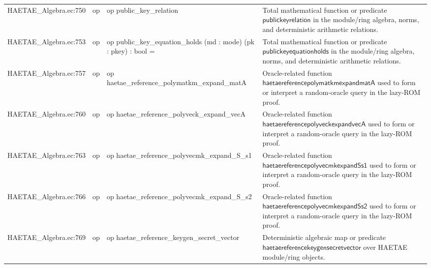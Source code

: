 \documentclass[10pt]{article}
\begin{document}
\begin{longtable}{L{0.11\textwidth}L{0.055\textwidth}L{0.385\textwidth}L{0.41\textwidth}}
HAETAE\_\allowbreak{}Algebra.\allowbreak{}ec:\allowbreak{}750 & op & {\ttfamily\scriptsize op public\_\allowbreak{}key\_\allowbreak{}relation} & Total mathematical function or predicate $\mathsf{publickeyrelation}$ in the module/ring algebra, norms, and deterministic arithmetic relations. \\
HAETAE\_\allowbreak{}Algebra.\allowbreak{}ec:\allowbreak{}753 & op & {\ttfamily\scriptsize op public\_\allowbreak{}key\_\allowbreak{}equation\_\allowbreak{}holds (md : mode) (pk : pkey) : bool =} & Total mathematical function or predicate $\mathsf{publickeyequationholds}$ in the module/ring algebra, norms, and deterministic arithmetic relations. \\
HAETAE\_\allowbreak{}Algebra.\allowbreak{}ec:\allowbreak{}757 & op & {\ttfamily\scriptsize op haetae\_\allowbreak{}reference\_\allowbreak{}polymatkm\_\allowbreak{}expand\_\allowbreak{}matA} & Oracle-related function $\mathsf{haetaereferencepolymatkmexpandmatA}$ used to form or interpret a random-oracle query in the lazy-ROM proof. \\
HAETAE\_\allowbreak{}Algebra.\allowbreak{}ec:\allowbreak{}760 & op & {\ttfamily\scriptsize op haetae\_\allowbreak{}reference\_\allowbreak{}polyveck\_\allowbreak{}expand\_\allowbreak{}vecA} & Oracle-related function $\mathsf{haetaereferencepolyveckexpandvecA}$ used to form or interpret a random-oracle query in the lazy-ROM proof. \\
HAETAE\_\allowbreak{}Algebra.\allowbreak{}ec:\allowbreak{}763 & op & {\ttfamily\scriptsize op haetae\_\allowbreak{}reference\_\allowbreak{}polyvecmk\_\allowbreak{}expand\_\allowbreak{}S\_\allowbreak{}s1} & Oracle-related function $\mathsf{haetaereferencepolyvecmkexpandSs1}$ used to form or interpret a random-oracle query in the lazy-ROM proof. \\
HAETAE\_\allowbreak{}Algebra.\allowbreak{}ec:\allowbreak{}766 & op & {\ttfamily\scriptsize op haetae\_\allowbreak{}reference\_\allowbreak{}polyvecmk\_\allowbreak{}expand\_\allowbreak{}S\_\allowbreak{}s2} & Oracle-related function $\mathsf{haetaereferencepolyvecmkexpandSs2}$ used to form or interpret a random-oracle query in the lazy-ROM proof. \\
HAETAE\_\allowbreak{}Algebra.\allowbreak{}ec:\allowbreak{}769 & op & {\ttfamily\scriptsize op haetae\_\allowbreak{}reference\_\allowbreak{}keygen\_\allowbreak{}secret\_\allowbreak{}vector} & Deterministic algebraic map or predicate $\mathsf{haetaereferencekeygensecretvector}$ over HAETAE module/ring objects. \\

\end{longtable}
\end{document}
